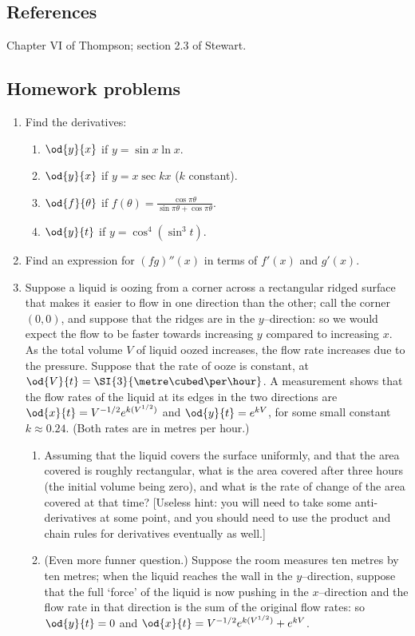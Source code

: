 \subsection{References}
Chapter VI of Thompson; section 2.3 of Stewart.

\subsection{Homework problems}
\begin{enumerate}
  \item Find the derivatives:
    \begin{enumerate}
      \item $ \od{y}{x} $ if $ y = \sin x \ln x $.
      \item $ \od{y}{x} $ if $ y = x \sec kx $ ($ k $ constant).
      \item $ \od{f}{\theta} $ if $ f(\theta) = \frac{\cos \pi \theta}{\sin \pi \theta + \cos \pi \theta} $.
      \item $ \od{y}{t} $ if $ y = \cos^4 (\sin^3 t) $.
    \end{enumerate}
  \item Find an expression for $ (fg)''(x) $ in terms of $ f'(x) $ and $ g'(x) $.
  \item Suppose a liquid is oozing from a corner across a rectangular ridged surface that makes it
        easier to flow in one direction than the other; call the corner $ (0,0) $, and suppose that
        the ridges are in the $ y$--direction: so we would expect the flow to be faster towards increasing
        $ y $ compared to increasing $ x $. As the total volume $ V $ of liquid oozed increases, the flow rate increases
        due to the pressure. Suppose that the rate of ooze is constant, at $ \od{V}{t} = \SI{3}{\metre\cubed\per\hour} $.
        A measurement shows that the flow rates of the liquid at its edges in the two directions are $ \od{x}{t} = V^{-1/2} e^{k(V^{1/2})} $
        and $ \od{y}{t} = e^{kV} $, for some small constant $ k \approx 0.24 $. (Both rates are in metres per hour.)
    \begin{enumerate}
      \item Assuming that the liquid covers the surface uniformly, and that the area covered is roughly rectangular,
            what is the area covered after three hours (the initial volume being zero), and what is the rate of change
            of the area covered at that time? [Useless hint: you will need to take some anti-derivatives at some point, and you
            should need to use the product and chain rules for derivatives eventually as well.]
      \item (Even more funner question.) Suppose the room measures ten metres by ten metres; when the liquid reaches the wall
            in the $ y$--direction, suppose that the full `force' of the liquid is now pushing in the $ x$--direction and the
            flow rate in that direction is the sum of the original flow rates: so $ \od{y}{t} = 0 $ and $ \od{x}{t} = V^{-1/2} e^{k(V^{1/2})} + e^{kV} $.


\end{enumerate}
\end{enumerate}
